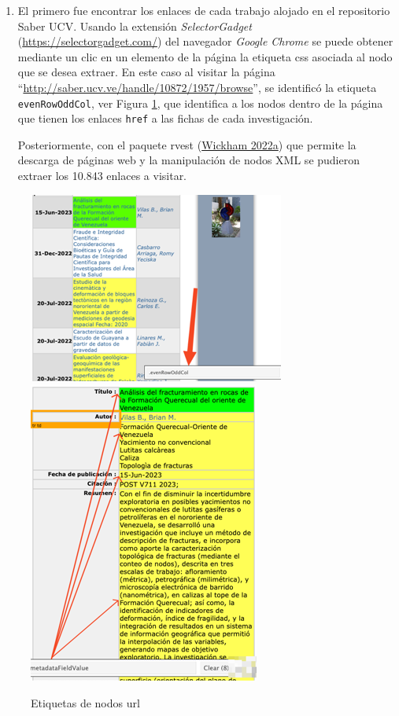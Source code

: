 \documentclass[
  12pt,
  openany]{book}
\begin{document}
\begin{enumerate}
\def\labelenumi{\arabic{enumi}.}
\item
  El primero fue encontrar los enlaces de cada trabajo alojado en el repositorio Saber UCV. Usando la extensión \emph{SelectorGadget} (\protect\hyperlink{0}{https://selectorgadget.com/}) del navegador \emph{Google Chrome} se puede obtener mediante un clic en un elemento de la página la etiqueta css asociada al nodo que se desea extraer. En este caso al visitar la página ``\protect\hyperlink{0}{http://saber.ucv.ve/handle/10872/1957/browse}'', se identificó la etiqueta \texttt{evenRowOddCol}, ver Figura \ref{fig:nodosurl}, que identifica a los nodos dentro de la página que tienen los enlaces \texttt{href} a las fichas de cada investigación.

  Posteriormente, con el paquete rvest (\protect\hyperlink{ref-rvest}{Wickham 2022a}) que permite la descarga de páginas web y la manipulación de nodos XML se pudieron extraer los 10.843 enlaces a visitar.
\end{enumerate}

\begin{figure}

{\centering \includegraphics[width=0.5\linewidth]{images/05-desarrollo/1_ciclo/Picture3} \includegraphics[width=0.5\linewidth]{images/05-desarrollo/1_ciclo/Picture2} 

}

\caption{Etiquetas de nodos url}\label{fig:nodosurl}
\end{figure}
\end{document}
